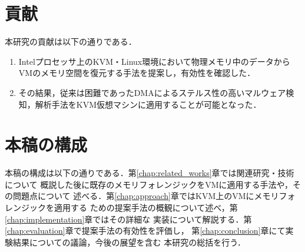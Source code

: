 \section{貢献}

本研究の貢献は以下の通りである．

\begin{enumerate}

    \item Intelプロセッサ上のKVM・Linux環境において物理メモリ中のデータからVMのメモリ空間を復元する手法を提案し，有効性を確認した．
    \item その結果，従来は困難であったDMAによるステルス性の高いマルウェア検知，解析手法をKVM仮想マシンに適用することが可能となった．

\end{enumerate}


\section{本稿の構成}

本稿の構成は以下の通りである．第\ref{chap:related_works}章では関連研究・技術について
概説した後に既存のメモリフォレンジックをVMに適用する手法や，その問題点について
述べる．第\ref{chap:approach}章ではKVM上のVMにメモリフォレンジックを適用する
ための提案手法の概観について述べ，第\ref{chap:implementation}章ではその詳細な
実装について解説する．第\ref{chap:evaluation}章で提案手法の有効性を評価し，
第\ref{chap:conclusion}章にて実験結果についての議論，今後の展望を含む
本研究の総括を行う．

